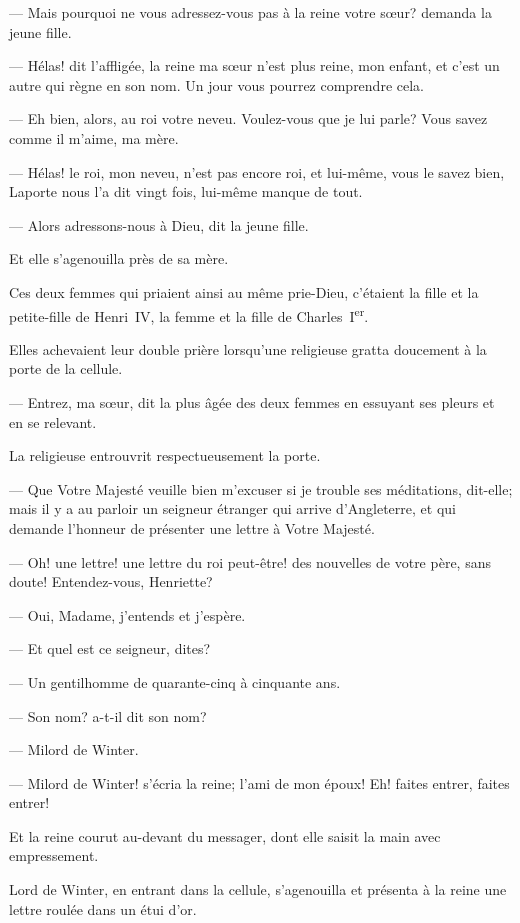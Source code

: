 — Mais pourquoi ne vous adressez-vous pas à la reine votre sœur? demanda la jeune fille.

— Hélas! dit l'affligée, la reine ma sœur n'est plus reine, mon enfant, et c'est un autre qui règne en son nom. Un jour vous pourrez comprendre cela.

— Eh bien, alors, au roi votre neveu. Voulez-vous que je lui parle? Vous savez comme il m'aime, ma mère.

— Hélas! le roi, mon neveu, n'est pas encore roi, et lui-même, vous le savez bien, Laporte nous l'a dit vingt fois, lui-même manque de tout.

— Alors adressons-nous à Dieu, dit la jeune fille.

Et elle s'agenouilla près de sa mère.

Ces deux femmes qui priaient ainsi au même prie-Dieu, c'étaient la fille et la petite-fille de Henri~IV, la femme et la fille de Charles~I\textsuperscript{er}.

Elles achevaient leur double prière lorsqu'une religieuse gratta doucement à la porte de la cellule.

— Entrez, ma sœur, dit la plus âgée des deux femmes en essuyant ses pleurs et en se relevant.

La religieuse entrouvrit respectueusement la porte.

— Que Votre Majesté veuille bien m'excuser si je trouble ses méditations, dit-elle; mais il y a au parloir un seigneur étranger qui arrive d'Angleterre, et qui demande l'honneur de présenter une lettre à Votre Majesté.

— Oh! une lettre! une lettre du roi peut-être! des nouvelles de votre père, sans doute! Entendez-vous, Henriette?

— Oui, Madame, j'entends et j'espère.

— Et quel est ce seigneur, dites?

— Un gentilhomme de quarante-cinq à cinquante ans.

— Son nom? a-t-il dit son nom?

— Milord de Winter.

— Milord de Winter! s'écria la reine; l'ami de mon époux! Eh! faites entrer, faites entrer!

Et la reine courut au-devant du messager, dont elle saisit la main avec empressement.

Lord de Winter, en entrant dans la cellule, s'agenouilla et présenta à la reine une lettre roulée dans un étui d'or.

